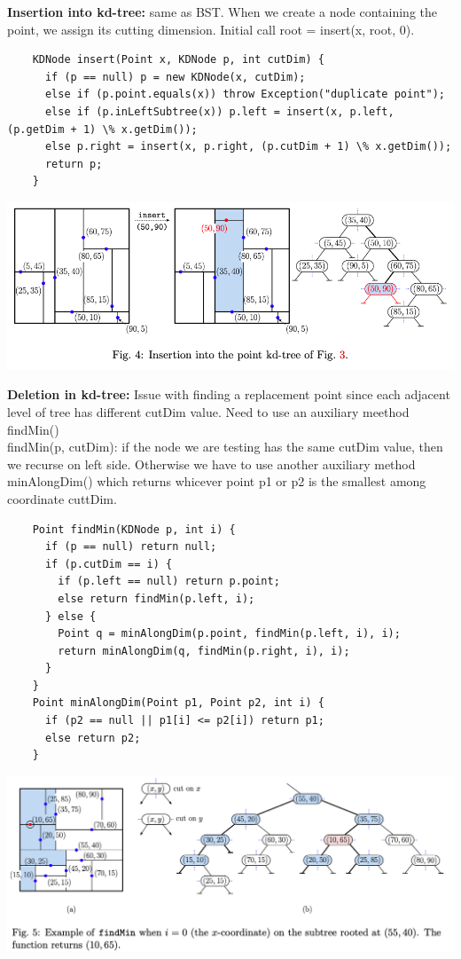 \documentclass{article}
\begin{document}
  \textbf{Insertion into kd-tree: } same as BST. When we create a node containing the point, we assign its cutting dimension. Initial call root = insert(x, root, 0).
  \begin{lstlisting}
    KDNode insert(Point x, KDNode p, int cutDim) {
      if (p == null) p = new KDNode(x, cutDim);
      else if (p.point.equals(x)) throw Exception("duplicate point");
      else if (p.inLeftSubtree(x)) p.left = insert(x, p.left, (p.getDim + 1) \% x.getDim());
      else p.right = insert(x, p.right, (p.cutDim + 1) \% x.getDim());
      return p;
    }
  \end{lstlisting}
  \begin{center}
  \includegraphics[scale=0.4]{KDInsertion}
  \end{center}
  \textbf{Deletion in kd-tree: }Issue with finding a replacement point since each adjacent level of tree has different cutDim value. Need to use an auxiliary meethod findMin()\\
  findMin(p, cutDim): if the node we are testing has the same cutDim value, then we recurse on left side. Otherwise we have to use another auxiliary method minAlongDim() which returns whicever point p1 or p2 is the smallest among coordinate cuttDim.
  \begin{lstlisting}
    Point findMin(KDNode p, int i) {
      if (p == null) return null;
      if (p.cutDim == i) {
        if (p.left == null) return p.point;
        else return findMin(p.left, i);
      } else {
        Point q = minAlongDim(p.point, findMin(p.left, i), i);
        return minAlongDim(q, findMin(p.right, i), i);
      }
    }
    Point minAlongDim(Point p1, Point p2, int i) {
      if (p2 == null || p1[i] <= p2[i]) return p1;
      else return p2;
    }
  \end{lstlisting}
  \begin{center}
  \includegraphics[scale=0.33]{KDTreeFindMin}
  \end{center}
\end{document}
